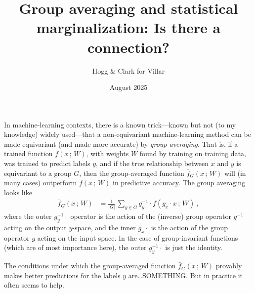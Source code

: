 \documentclass{article}
\title{\bfseries%
Group averaging and statistical marginalization:
Is there a connection?}
\author{Hogg \& Clark for Villar}
\date{August 2025}
\newcommand{\semic}{\,;\,}
\begin{document}
\maketitle

In machine-learning contexts, there is a known trick---known but not (to my knowledge) widely used---that a non-equivariant machine-learning method can be made equivariant (and made more accurate) by \emph{group averaging}.
That is, if a trained function $f(x\semic W)$, with weights $W$ found by training on training data, was trained to predict labels $y$, and if the true relationship between $x$ and $y$ is equivariant to a group $G$, then the group-averaged function $\bar{f}_G(x\semic W)$ will (in many cases) outperform $f(x\semic W)$ in predictive accuracy.
The group averaging looks like
\begin{align}
    \bar{f}_G(x\semic W) &= \frac{1}{|G|}\,\sum_{g\in G} g_y^{-1}\cdot f(g_x\cdot x\semic W) ~,
\end{align}
where the outer $g_y^{-1}\cdot$ operator is the action of the (inverse) group operator $g^{-1}$ acting on the output $y$-space, and the inner $g_x\cdot$ is the action of the group operator $g$ acting on the input space.
In the case of group-invariant functions (which are of most importance here), the outer $g_y^{-1}\cdot$ is just the identity.

The conditions under which the group-averaged function $\bar{f}_G(x\semic W)$ provably makes better predictions for the labels $y$ are\ldots SOMETHING.
But in practice it often seems to help.
\end{document}

